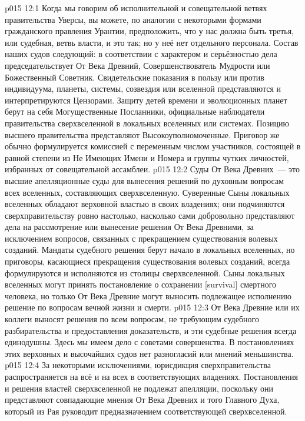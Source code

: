\vs p015 12:1 Когда мы говорим об исполнительной и совещательной ветвях правительства Уверсы, вы можете, по аналогии с некоторыми формами гражданского правления Урантии, предположить, что у нас должна быть третья, или судебная, ветвь власти, и это так; но у неё нет отдельного персонала. Состав наших судов следующий: в соответствии с характером и серьёзностью дела председательствует От Века Древний, Совершенствователь Мудрости или Божественный Советник. Свидетельские показания в пользу или против индивидуума, планеты, системы, созвездия или вселенной представляются и интерпретируются Цензорами. Защиту детей времени и эволюционных планет берут на себя Могущественные Посланники, официальные наблюдатели правительства сверхвселенной в локальных вселенных или системах. Позицию высшего правительства представляют Высокоуполномоченные. Приговор же обычно формулируется комиссией с переменным числом участников, состоящей в равной степени из Не Имеющих Имени и Номера и группы чутких личностей, избранных от совещательной ассамблеи.
\vs p015 12:2 Суды От Века Древних~--- это высшие апелляционные суды для вынесения решений по духовным вопросам всех вселенных, составляющих сверхвселенную. Суверенные Сыны локальных вселенных обладают верховной властью в своих владениях; они подчиняются сверхправительству ровно настолько, насколько сами добровольно представляют дела на рассмотрение или вынесение решения От Века Древними, за исключением вопросов, связанных с прекращением существования волевых созданий. Мандаты судебного решения берут начало в локальных вселенных, но приговоры, касающиеся прекращения существования волевых созданий, всегда формулируются и исполняются из столицы сверхвселенной. Сыны локальных вселенных могут принять постановление о сохранении [survival] смертного человека, но только От Века Древние могут выносить подлежащее исполнению решение по вопросам вечной жизни и смерти.
\vs p015 12:3 От Века Древние или их коллеги выносят решения по всем вопросам, не требующим судебного разбирательства и предоставления доказательств, и эти судебные решения всегда единодушны. Здесь мы имеем дело с советами совершенства. В постановлениях этих верховных и высочайших судов нет разногласий или мнений меньшинства.
\vs p015 12:4 За некоторыми исключениями, юрисдикция сверхправительства распространяется на всё и на всех в соответствующих владениях. Постановления и решения властей сверхвселенной не подлежат апелляции, поскольку они представляют совпадающие мнения От Века Древних и того Главного Духа, который из Рая руководит предназначением соответствующей сверхвселенной.
